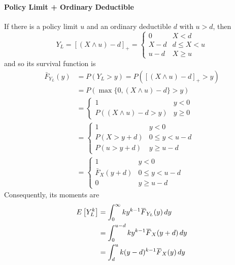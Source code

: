 \documentclass[notoc,notitlepage]{tufte-book}
\begin{document}
\paragraph{Policy Limit + Ordinary Deductible} If there is a policy limit $u$ and an ordinary deductible $d$ with $u > d$, then
\begin{equation*}
  Y_L = [ ( X \land u ) - d ]_+ = \begin{cases}
    0 & X < d \\
    X - d & d \leq X < u \\
    u - d & X \geq u
  \end{cases}
\end{equation*}
and so its survival function is
\begin{align*}
  \bar{F}_{Y_L}(y) & = P ( Y_L > y ) = P ( [ (X \land u) - d ]_+ > y ) \\
                   & = P ( \max\{ 0, (X \land u) - d \} > y ) \\
                   & = \begin{cases}
                     1                        & y < 0 \\
                     P( (X \land u) - d > y ) & y \geq 0
                   \end{cases} \\
                   &= \begin{cases}
                     1            & y < 0 \\
                     P(X > y + d) & 0 \leq y < u - d \\
                     P(u > y + d) & y \geq u - d
                   \end{cases} \\
                   &= \begin{cases}
                     1                & y < 0 \\
                     \bar{F}_X(y + d) & 0 \leq y < u - d \\
                     0                & y \geq u - d
                   \end{cases}
\end{align*}
Consequently, its moments are
\begin{align*}
  E \left[ Y_L^k \right] &= \int_{0}^{\infty} k y^{k - 1} \bar{F}_{Y_L}(y) \dif{y} \\
                         &= \int_{0}^{u - d} k y^{k - 1} \bar{F}_X(y + d) \dif{y} \\
                         &= \int_{d}^{u} k ( y - d )^{k - 1} \bar{F}_X(y) \dif{y} 
\end{align*}
\end{document}
